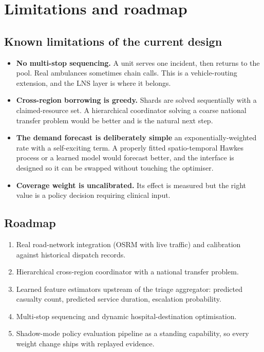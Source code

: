 \section{Limitations and roadmap}

\subsection{Known limitations of the current design}

\begin{itemize}
\item \textbf{No multi-stop sequencing.} A unit serves one incident, then
      returns to the pool. Real ambulances sometimes chain calls. This is a
      vehicle-routing extension, and the LNS layer is where it belongs.
\item \textbf{Cross-region borrowing is greedy.} Shards are solved
      sequentially with a claimed-resource set. A hierarchical coordinator
      solving a coarse national transfer problem would be better and is the
      natural next step.
\item \textbf{The demand forecast is deliberately simple} \textemdash{} an
      exponentially-weighted rate with a self-exciting term. A properly fitted
      spatio-temporal Hawkes process or a learned model would forecast better,
      and the interface is designed so it can be swapped without touching the
      optimiser.
\item \textbf{Coverage weight is uncalibrated.} Its effect is measured but the
      right value is a policy decision requiring clinical input.
\end{itemize}

\subsection{Roadmap}

\begin{enumerate}
\item Real road-network integration (OSRM with live traffic) and calibration
      against historical dispatch records.
\item Hierarchical cross-region coordinator with a national transfer problem.
\item Learned feature estimators upstream of the triage aggregator: predicted
      casualty count, predicted service duration, escalation probability.
\item Multi-stop sequencing and dynamic hospital-destination optimisation.
\item Shadow-mode policy evaluation pipeline as a standing capability, so
      every weight change ships with replayed evidence.
\end{enumerate}

